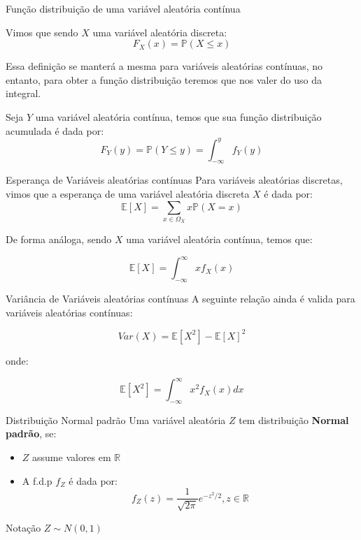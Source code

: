 \begin{frame}{Função distribuição de uma variável aleatória contínua}

   Vimos que sendo $X$ uma variável aleatória discreta:
    $$F_X(x) = \mathds{P}(X \leq x)$$

    Essa definição se manterá a mesma para variáveis aleatórias contínuas, no entanto, para obter a função distribuição teremos que nos valer do uso da integral.

    \begin{definicao}
        Seja $Y$ uma variável aleatória contínua, temos que sua função distribuição acumulada é dada por:
            $$F_Y(y) = \mathds{P}(Y \leq y) = \int_{-\infty}^{y} f_Y(y)$$
    \end{definicao}

\end{frame}
\begin{frame}{Esperança de Variáveis aleatórias contínuas}
    Para variáveis aleatórias discretas, vimos que a esperança de uma variável aleatória discreta $X$ é dada por:
    $$\mathbb{E}[X] = \sum_{x \in \Omega_X} x \mathds{P}(X=x)$$

    De forma análoga, sendo $X$ uma variável aleatória contínua, temos que:

    $$\mathbb{E}[X] = \int_{-\infty}^{\infty} x f_X(x)$$
\end{frame}
\begin{frame}{Variância de Variáveis aleatórias contínuas}
    A seguinte relação ainda é valida para variáveis aleatórias contínuas:

    $$Var(X) = \mathbb{E}[X^2] - \mathbb{E}[X]^2$$

    onde:

    $$\mathbb{E}[X^2] = \int_{-\infty}^{\infty} x^2 f_X(x)dx$$
\end{frame}

\begin{frame}{Distribuição Normal padrão}
    Uma variável aleatória $Z$ tem distribuição \textbf{Normal padrão}, se:

    \begin{itemize}
        \item $Z$ assume valores em $\mathbb{R}$
        \item A f.d.p $f_Z$ é dada por:
        $$f_Z(z) = \dfrac{1}{\sqrt{2\pi}} e^{-z^2/2}, z\in \mathbb{R}$$
    \end{itemize}

    Notação $Z \sim N(0,1)$
\end{frame}

